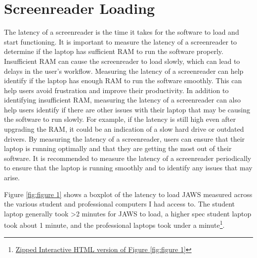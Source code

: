\documentclass[12pt,letterpaper,twoside]{extreport}
\begin{document}
\pagebreak \hypertarget{screenreader-loading}{}\section{Screenreader Loading}\label{screenreader-loading}
The latency of a screenreader is the time it takes for the software to load and start functioning. It is important to measure the latency of a screenreader to determine if the laptop has sufficient RAM to run the software properly. Insufficient RAM can cause the screenreader to load slowly, which can lead to delays in the user’s workflow. Measuring the latency of a screenreader can help identify if the laptop has enough RAM to run the software smoothly. This can help users avoid frustration and improve their productivity. In addition to identifying insufficient RAM, measuring the latency of a screenreader can also help users identify if there are other issues with their laptop that may be causing the software to run slowly. For example, if the latency is still high even after upgrading the RAM, it could be an indication of a slow hard drive or outdated drivers. By measuring the latency of a screenreader, users can ensure that their laptop is running optimally and that they are getting the most out of their software. It is recommended to measure the latency of a screenreader periodically to ensure that the laptop is running smoothly and to identify any issues that may arise.

Figure \ref{fig:figure 1} shows a boxplot of the latency to load JAWS measured across the various student and professional computers I had access to. The student laptop generally took \textgreater2 minutes for JAWS to load, a higher spec student laptop took about 1 minute, and the professional laptops took under a minute\footnote{\href{https://github.com/mrhunsaker/MiscResources/raw/main/ComputerRBDisplaySpecsTVIFig1.zip}{Zipped Interactive HTML version of Figure \ref{fig:figure 1}}}.
\end{document}
